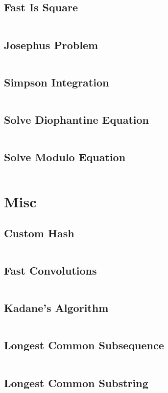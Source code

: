 \documentclass[a4paper, 8pt, landscape, oneside]{extarticle}
\begin{document}
\begin{multicols*}{3}
    	\subsection{Fast Is Square}
    	\inputminted{cpp}{src/math/issquare.hpp}
    	\subsection{Josephus Problem}
    	\inputminted{cpp}{src/math/josephus.hpp}
    	\subsection{Simpson Integration}
    	\inputminted{cpp}{src/math/simpsoninteg.hpp}
    	\subsection{Solve Diophantine Equation}
    	\inputminted{cpp}{src/math/solvedioeq.hpp}
    	\subsection{Solve Modulo Equation}
    	\inputminted{cpp}{src/math/solvemodeq.hpp}
    \section{Misc}
	    \subsection{Custom Hash}
	    \inputminted{cpp}{src/misc/old_customhash.cpp}
	    \subsection{Fast Convolutions}
	    \inputminted{cpp}{src/misc/old_fastconv.cpp}
	    \subsection{Kadane's Algorithm}
	    \inputminted{cpp}{src/misc/old_kadane.cpp}
	    \subsection{Longest Common Subsequence}
	    \inputminted{cpp}{src/misc/old_lcs.py}
	    \subsection{Longest Common Substring}
	    \inputminted{cpp}{src/misc/old_lcssubstr.py}

\end{multicols*}
\end{document}
